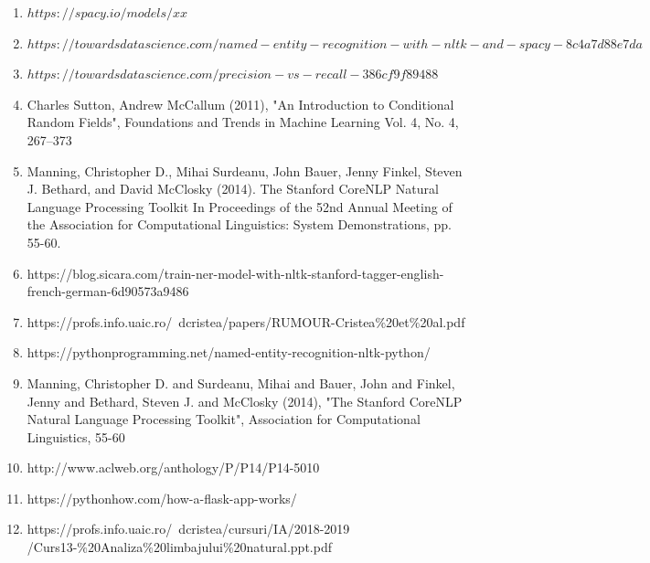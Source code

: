 \documentclass[12pt,a4paper]{article}
\begin{document}
\begin {center}
\begin{enumerate}
Cristea D., Gîfu D., Pistol I., Sfirnaciuc D., Niculiţă M. (2016) A Mixed Approach in Recognising Geographical Entities in Texts. In: Trandabăţ D., Gîfu D. (eds) Linguistic Linked Open Data. RUMOUR 2015. Communications in Computer and Information Science, vol 588. Springer, Cham
\item $https://spacy.io/models/xx$

\item $https://towardsdatascience.com/named-entity-recognition-with-nltk-and-spacy-8c4a7d88e7da$

\item $https://towardsdatascience.com/precision-vs-recall-386cf9f89488$

\item Charles Sutton, Andrew McCallum (2011), "An Introduction to Conditional Random Fields", Foundations and Trends in Machine Learning Vol. 4, No. 4, 267–373

\item Manning, Christopher D., Mihai Surdeanu, John Bauer, Jenny Finkel, Steven J. Bethard, and David McClosky (2014). The Stanford CoreNLP Natural Language Processing Toolkit In Proceedings of the 52nd Annual Meeting of the Association for Computational Linguistics: System Demonstrations, pp. 55-60.

\item https://blog.sicara.com/train-ner-model-with-nltk-stanford-tagger-english-french-german-6d90573a9486

\item https://profs.info.uaic.ro/~dcristea/papers/RUMOUR-Cristea$\%$20et$\%$20al.pdf

\item https://pythonprogramming.net/named-entity-recognition-nltk-python/

\item Manning, Christopher D. and  Surdeanu, Mihai  and  Bauer, John  and  Finkel, Jenny  and  Bethard, Steven J. and  McClosky (2014), "The Stanford CoreNLP Natural Language Processing Toolkit", Association for Computational Linguistics, 55-60

\item http://www.aclweb.org/anthology/P/P14/P14-5010

\item https://pythonhow.com/how-a-flask-app-works/

\item https://profs.info.uaic.ro/~dcristea/cursuri/IA/2018-2019\\/Curs13-$\%$20Analiza$\%$20limbajului$\%$20natural.ppt.pdf


\end{enumerate}
\end{center}
\end{document}
